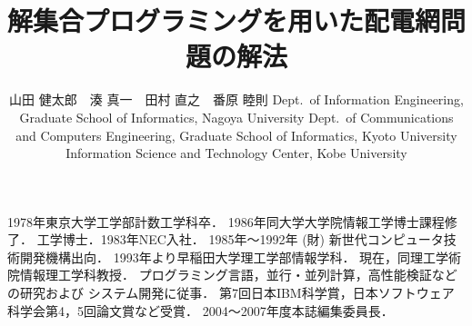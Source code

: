 \documentclass{compsoft}
\begin{document}
\title{解集合プログラミングを用いた配電網問題の解法}



\author{山田 健太郎　湊 真一　田村 直之　番原 睦則
%
%
%
%
%
{Dept.\ of Information Engineering, Graduate School of Informatics, Nagoya University}
%
{Dept.\ of Communications and Computers Engineering, Graduate School of Informatics, Kyoto University}
%
{Information Science and Technology Center, Kobe University}
%
%
%
}

%
\Jabstract{%
}
%
\Eabstract{

}
%
\maketitle











\begin{choshashoukai}

{1978年東京大学工学部計数工学科卒．
1986年同大学大学院情報工学博士課程修了．
工学博士．1983年NEC入社．
1985年〜1992年 (財) 新世代コンピュータ技術開発機構出向．
1993年より早稲田大学理工学部情報学科．
現在，同理工学術院情報理工学科教授．
プログラミング言語，並行・並列計算，高性能検証などの研究および
システム開発に従事．
第7回日本IBM科学賞，日本ソフトウェア科学会第4，5回論文賞など受賞．
2004〜2007年度本誌編集委員長．}

\end{choshashoukai}
\end{document}
